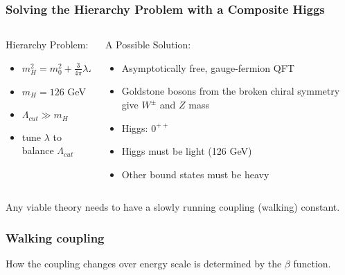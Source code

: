 \begin{frame}
  \frametitle{Solving the Hierarchy Problem with a Composite Higgs}
  \begin{columns}[T]
    \begin{column}{.5\textwidth}
      Hierarchy Problem:
      \begin{itemize}
        \item $m^2_H=m^2_0+\frac{3}{4\pi}\lambda\Lambda_{cut}^2$
        \item $m_H=126$ GeV
        \item $\Lambda_{cut} \gg m_H$
        \item tune $\lambda$ to balance $\Lambda_{cut}$
      \end{itemize}
    \end{column}
    \begin{column}{.5\textwidth}
      A Possible Solution:
      \begin{itemize}
        \item Asymptotically free, gauge-fermion QFT 
        \item Goldstone bosons from the broken chiral symmetry give $W^{\pm}$ and $Z$ mass
        \item Higgs:  $0^{++}$
        \item Higgs must be light (126 GeV)
        \item Other bound states must be heavy
      \end{itemize}
    \end{column}
  \end{columns}
  \vspace{12pt}
  Any viable theory needs to have a slowly running coupling (walking) constant.
\end{frame}

\begin{frame}
  \frametitle{Walking coupling}
  How the coupling changes over energy scale is determined by the $\beta$ function.
\end{frame}

